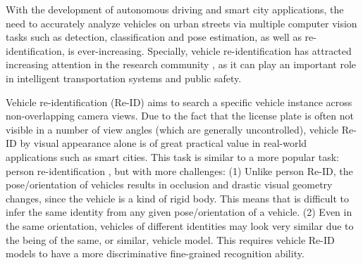 \documentclass[10pt,twocolumn,letterpaper]{article}
\begin{document}

With the development of autonomous driving
and smart city applications, the need to accurately analyze vehicles on urban streets
via multiple computer vision tasks such as detection, classification and
pose estimation, as well as re-identification, is ever-increasing.
%
Specially, vehicle re-identification has attracted increasing attention in the research community
\cite{liu2016vehicleid,liu2016veri,liu2016veri,
wang2017orientation,wang2017orientation,Zhou2018VAMI},
as it can play an important role in
intelligent transportation systems and public safety.

Vehicle re-identification (Re-ID) aims to search a specific vehicle
instance across non-overlapping camera views.
%
Due to the fact that the license plate is often not visible in a number of view angles (which are generally uncontrolled),
vehicle Re-ID by visual appearance alone is of great practical value in real-world applications such as smart cities.
%
This task is similar to a more popular task: person re-identification
\cite{gong2014re,chen2018person,Li2018Harmonious,xiao2016learning,
li2017person,wei2018person,song2018mask,chang2018multi,
shen2018deep,zhang2017deep,shen2018person,suh2018part},
but with more challenges:
(1) Unlike person Re-ID, the pose/orientation of vehicles results in occlusion and drastic visual geometry changes, since the vehicle is a kind of rigid body.
This means that is difficult to infer the same identity from any given pose/orientation of a vehicle.
(2) Even in the same orientation, vehicles of different identities may look very similar
due to the being of the same, or similar, vehicle model. This requires vehicle Re-ID models
to have a more discriminative fine-grained recognition ability.
\end{document}
